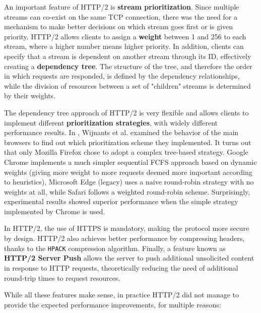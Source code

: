 An important feature of HTTP/2 is \textbf{stream prioritization}. Since multiple streams can co-exist on the same TCP connection, there was the need for a mechanism to make better decisions on which stream goes first or is given priority. HTTP/2 allows clients to assign a \textbf{weight} between 1 and 256 to each stream, where a higher number means higher priority. In addition, clients can specify that a stream is dependent on another stream through its ID, effectively creating a \textbf{dependency tree}. The structure of the tree, and therefore the order in which requests are responded, is defined by the dependency relationships, while the division of resources between a set of "children" streams is determined by their weights.

The dependency tree approach of HTTP/2 is very flexible and allows clients to implement different \textbf{prioritization strategies}, with widely different performance results. In \cite{http2pri}, Wijnants et al. examined the behavior of the main browsers to find out which prioritization scheme they implemented. It turns out that only Mozilla Firefox chose to adopt a complex tree-based strategy. Google Chrome implements a much simpler sequential FCFS approach based on dynamic weights (giving more weight to more requests deemed more important according to heuristics), Microsoft Edge (legacy) uses a naive round-robin strategy with no weights at all, while Safari follows a weighted round-robin scheme. Surprisingly, experimental results showed superior performance when the simple strategy implemented by Chrome is used.


In HTTP/2, the use of HTTPS is mandatory, making the protocol more secure by design. HTTP/2 also achieves better performance by compressing headers, thanks to the \texttt{HPACK} compression algorithm. Finally, a feature known as \textbf{HTTP/2 Server Push} allows the server to push additional unsolicited content in response to HTTP requests, theoretically reducing the need of additional round-trip times to request resources.

While all these features make sense, in practice HTTP/2 did not manage to provide the expected performance improvements, for multiple reasons:

